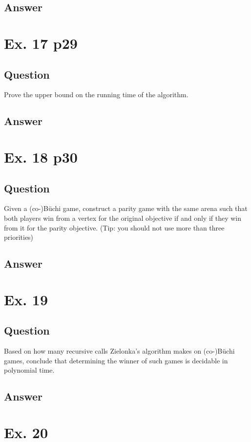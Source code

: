 \documentclass[12pt]{article}
\begin{document}
\subsection{Answer}


\section{Ex. 17 p29}
\subsection{Question}
Prove the upper bound on the running time of the algorithm.

\subsection{Answer}

\section{Ex. 18 p30}
\subsection{Question}
Given a (co-)Büchi game, construct a parity game with the same arena such that both players win from a vertex for the original objective if and only if they win from it for the parity objective.
(Tip: you should not use more than three priorities)

\subsection{Answer}

\section{Ex. 19}
\subsection{Question}
Based on how many recursive calls Zielonka’s algorithm makes on (co-)Büchi games, conclude that determining the winner of such games is decidable in polynomial time.

\subsection{Answer}

\section{Ex. 20}
\end{document}
